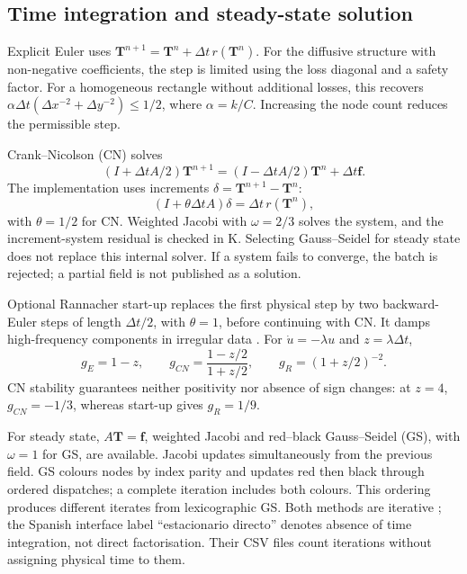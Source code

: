 \documentclass[11pt,a4paper]{article}
\newcommand{\dt}{\Delta t}
\begin{document}
\subsection{Time integration and steady-state solution}
Explicit Euler uses $\mathbf T^{n+1}=\mathbf T^n+\dt\,r(\mathbf T^n)$. For the diffusive structure with non-negative coefficients, the step is limited using the loss diagonal and a safety factor. For a homogeneous rectangle without additional losses, this recovers $\alpha\dt(\Delta x^{-2}+\Delta y^{-2})\leq1/2$, where $\alpha=k/C$. Increasing the node count reduces the permissible step.

Crank--Nicolson (CN) \cite{crank} solves
\begin{equation}
 (I+\dt A/2)\mathbf T^{n+1}=(I-\dt A/2)\mathbf T^n+\dt\mathbf f.
\end{equation}
The implementation uses increments $\delta=\mathbf T^{n+1}-\mathbf T^n$:
\begin{equation}
 (I+\theta\dt A)\delta=\dt\,r(\mathbf T^n),
 \label{eq:increment}
\end{equation}
with $\theta=1/2$ for CN. Weighted Jacobi with $\omega=2/3$ solves the system, and the increment-system residual is checked in K. Selecting Gauss--Seidel for steady state does not replace this internal solver. If a system fails to converge, the batch is rejected; a partial field is not published as a solution.

Optional Rannacher start-up replaces the first physical step by two backward-Euler steps of length $\dt/2$, with $\theta=1$, before continuing with CN. It damps high-frequency components in irregular data \cite{rannacher}. For $\dot u=-\lambda u$ and $z=\lambda\dt$,
\begin{equation}
 g_E=1-z,\qquad g_{CN}=\frac{1-z/2}{1+z/2},\qquad g_R=(1+z/2)^{-2}.
 \label{eq:gains}
\end{equation}
CN stability guarantees neither positivity nor absence of sign changes: at $z=4$, $g_{CN}=-1/3$, whereas start-up gives $g_R=1/9$.

For steady state, $A\mathbf T=\mathbf f$, weighted Jacobi and red--black Gauss--Seidel (GS), with $\omega=1$ for GS, are available. Jacobi updates simultaneously from the previous field. GS colours nodes by index parity and updates red then black through ordered dispatches; a complete iteration includes both colours. This ordering produces different iterates from lexicographic GS. Both methods are iterative \cite{templates}; the Spanish interface label ``estacionario directo'' denotes absence of time integration, not direct factorisation. Their CSV files count iterations without assigning physical time to them.
\end{document}
